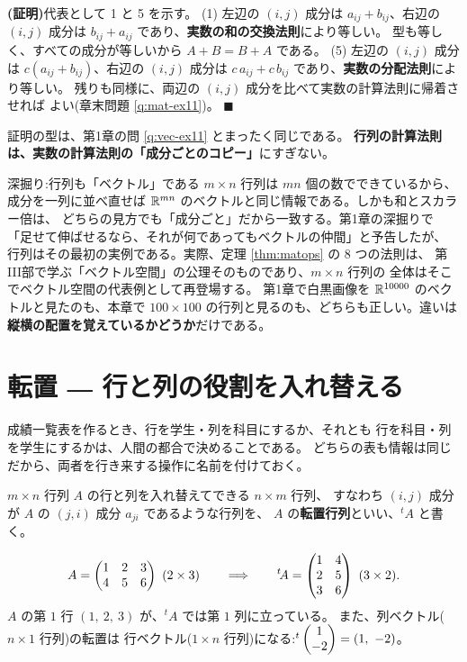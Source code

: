 \noindent\textbf{(証明)}\quad 代表として 1 と 5 を示す。
(1) 左辺の $(i,j)$ 成分は $a_{ij} + b_{ij}$、右辺の $(i,j)$ 成分は
$b_{ij} + a_{ij}$ であり、\textbf{実数の和の交換法則}により等しい。
型も等しく、すべての成分が等しいから $A + B = B + A$ である。
(5) 左辺の $(i,j)$ 成分は $c(a_{ij} + b_{ij})$、右辺の $(i,j)$ 成分は
$c\,a_{ij} + c\,b_{ij}$ であり、\textbf{実数の分配法則}により等しい。
残りも同様に、両辺の $(i,j)$ 成分を比べて実数の計算法則に帰着させれば
よい(章末問題 \ref{q:mat-ex11})。 $\blacksquare$

証明の型は、第1章の問 \ref{q:vec-ex11} とまったく同じである。
\textbf{行列の計算法則は、実数の計算法則の「成分ごとのコピー」}にすぎない。

\begin{itembox}[l]{深掘り:行列も「ベクトル」である}
$m \times n$ 行列は $mn$ 個の数でできているから、成分を一列に並べ直せば
$\mathbb{R}^{mn}$ のベクトルと同じ情報である。しかも和とスカラー倍は、
どちらの見方でも「成分ごと」だから一致する。第1章の深掘りで
「足せて伸ばせるなら、それが何であってもベクトルの仲間」と予告したが、
行列はその最初の実例である。実際、定理 \ref{thm:matops} の $8$ つの法則は、
第III部で学ぶ「ベクトル空間」の公理そのものであり、$m \times n$ 行列の
全体はそこでベクトル空間の代表例として再登場する。
第1章で白黒画像を $\mathbb{R}^{10000}$ のベクトルと見たのも、本章で
$100 \times 100$ の行列と見るのも、どちらも正しい。違いは
\textbf{縦横の配置を覚えているかどうか}だけである。
\end{itembox}

\section{転置 ― 行と列の役割を入れ替える}

成績一覧表を作るとき、行を学生・列を科目にするか、それとも
行を科目・列を学生にするかは、人間の都合で決めることである。
どちらの表も情報は同じだから、両者を行き来する操作に名前を付けておく。

\begin{teigi}[転置行列]
$m \times n$ 行列 $A$ の行と列を入れ替えてできる $n \times m$ 行列、
すなわち $(i,j)$ 成分が $A$ の $(j,i)$ 成分 $a_{ji}$ であるような行列を、
$A$ の\textbf{転置行列}といい、${}^t\!A$ と書く。
\end{teigi}

\begin{rei}
\[
A = \begin{pmatrix}1 & 2 & 3 \\ 4 & 5 & 6\end{pmatrix}\ (2 \times 3)
\qquad \Longrightarrow \qquad
{}^t\!A = \begin{pmatrix}1 & 4 \\ 2 & 5 \\ 3 & 6\end{pmatrix}\ (3 \times 2).
\]
$A$ の第 $1$ 行 $(1,\ 2,\ 3)$ が、${}^t\!A$ では第 $1$ 列に立っている。
また、列ベクトル($n \times 1$ 行列)の転置は
行ベクトル($1 \times n$ 行列)になる:${}^t\mat{1 \\ -2} = (1,\ -2)$。
\end{rei}

